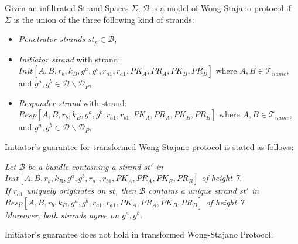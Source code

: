 \begin{Definition}
Given an infiltrated Strand Spaces $\Sigma$, $\mathcal{B}$ is a model of Wong-Stajano protocol if $\Sigma$ is the union of the three following kind of strands:
\begin{itemize}
\item \emph{Penetrator strands} $st_p \in \mathcal{B}$,
\item \emph{Initiator strand} with strand: {\footnotesize $Init[A,B,r_b,k_B,g^a,g^b,r_{a1},r_{a1},PK_A,PR_A,PK_B,PR_B]$} where $A,B \in \mathcal{T}_{name}$, and $g^a,g^b \in \mathcal{D} \backslash \mathcal{D}_{P}$,
\item \emph{Responder strand} with strand: {\footnotesize $Resp[A,B,r_b,k_B,g^a,g^b,r_{a1},r_{b1},PK_A,PR_A,PK_B,PR_B]$} where $A,B \in \mathcal{T}_{name}$, and $g^a,g^b \in \mathcal{D} \backslash \mathcal{D}_{P}$,
\end{itemize}
\end{Definition}

Initiator's guarantee for transformed Wong-Stajano protocol is stated as follows:

\textit{Let $\mathcal{B}$ be a bundle containing a strand $st'$ in \\ {\footnotesize $Init[A,B,r_b,k_B,g^a,g^b,r_{a1},r_{b1},PK_A,PR_A,PK_B,PR_B]$} of height 7. \\ If $r_{a1}$ uniquely originates on $st$, then $\mathcal{B}$ contains a unique strand $st'$ in\\ {\footnotesize $Resp[A,B,r_b,k_B,g^a,g^b,r_{a1},r_{a1},PK_A,PR_A,PK_B,PR_B]$} of height 7. \\ Moreover, both strands agree on $g^a,g^b$.}

\begin{Proposition}
Initiator's guarantee does not hold in transformed Wong-Stajano Protocol. 
\end{Proposition}

